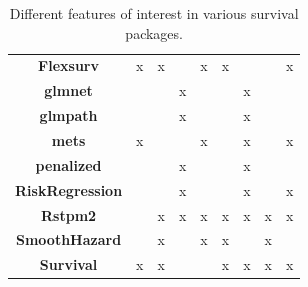 \documentclass[
]{jss}
\begin{document}
\begin{table}[ht]
{\begin{tabular}{ccccccccc}
\textbf{Flexsurv} \cite{flexsurv}       & x                        & x                         &                       & x                & x                   &                          &                                  & x               \\
\textbf{glmnet} \cite{regpathcox}         &                          &                           & x                     &                  &                     & x                        &                                  &                                  \\
\textbf{glmpath} \cite{park_hastie}       &                          &                           & x                     &                  &                     & x                        &                                  &                                  \\
\textbf{mets} \cite{scheike2014estimating}           & x                        &                           &                       & x                &                     & x                        &                                  & x                                \\
\textbf{penalized} \cite{goeman_meijer2019}      &                          &                           & x                     &                  &                     & x                        &                                  &                                  \\
\textbf{RiskRegression} \cite{gerds_blanche} &                          &                           & x                     &                  &                     & x                        &                                  & x                                \\
\textbf{Rstpm2} \cite{clements_liu}         &                          & x                         & x                     & x                & x                   & x                        & x                                & x                         \\
\textbf{SmoothHazard} \cite{smoothHazard}   &                          & x                         &                       & x                & x                   &                          & x                            &                                      \\
\textbf{Survival} \cite{survival-package}       & x                        & x                         &                       &                  & x                   & x                        & x                                & x                               
\end{tabular}%
}
\caption{Different features of interest in various survival packages.}
\label{tab:surv-pkgs}
\end{table}
\end{document}
